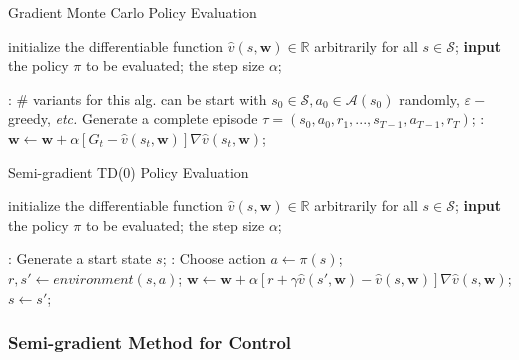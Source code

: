 \documentclass{progartcn}
\begin{document}
				\begin{algorithm}[h]
				\caption{Gradient Monte Carlo Policy Evaluation}
				\label{alg: Gradient Monte-Carlo Policy Evaluation}
				\begin{algorithmic}[1]
					\State initialize the differentiable function $\hat{v}(s,\bm{w})\in\mathbb{R}$ arbitrarily for all $s\in\mathcal{S}$; 
		            \State \textbf{input} the policy $\pi$ to be evaluated; the step size $\alpha$;
		            
		            :
		            	\Statex \# variants for this alg. can be start with $s_0\in\mathcal{S},a_0\in\mathcal{A}(s_0)$ randomly, $\varepsilon-$greedy, \textit{etc.}
		            	\State Generate a complete episode $\tau=(s_0,a_0,r_1,...,s_{T-1},a_{T-1},r_{T})$;
		            	:
		            		\State $\bm{w}\gets\bm{w}+\alpha[G_t-\hat{v}(s_t,\bm{w})]\nabla \hat{v}(s_t,\bm{w})$;
		            	\EndFor
		            \EndFor
		        \end{algorithmic}
		        \end{algorithm}

		        \begin{algorithm}[h]
				\caption{Semi-gradient TD(0) Policy Evaluation}
				\label{alg: Semi-gradient TD(0) Policy Evaluation}
				\begin{algorithmic}[1]
					\State initialize the differentiable function $\hat{v}(s,\bm{w})\in\mathbb{R}$ arbitrarily for all $s\in\mathcal{S}$; 
		            \State \textbf{input} the policy $\pi$ to be evaluated; the step size $\alpha$;
		            
		            :
		            	\State Generate a start state $s$;
		            	:
		            		\State Choose action $a\gets\pi(s)$;
		            		\State $r,s'\gets environment(s,a)$;
		            		\State $\bm{w}\gets\bm{w}+\alpha[r+\gamma\hat{v}(s',\bm{w})-\hat{v}(s,\bm{w})]\nabla \hat{v}(s,\bm{w})$;
		            		\State $s\gets s'$;
		            	\EndWhile
		            \EndFor
		        \end{algorithmic}
		        \end{algorithm}


			\subsubsection{Semi-gradient Method for Control} %
\end{document}
